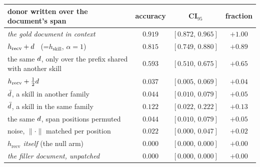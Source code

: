 \begin{tabular}{@{}lccc@{}}
\toprule
donor written over the document's span & accuracy & CI$_{95}$ & fraction \\
\midrule
\emph{the gold document in context} & $0.919$ & $[0.872,\,0.965]$ & $+1.00$ \\
$h_{\text{recv}}+d$ \ (=$h_{\text{skill}}$, $\alpha=1$) & $0.815$ & $[0.749,\,0.880]$ & $+0.89$ \\
the same $d$, only over the prefix shared with another skill & $0.593$ & $[0.510,\,0.675]$ & $+0.65$ \\
$h_{\text{recv}}+\tfrac12d$ & $0.037$ & $[0.005,\,0.069]$ & $+0.04$ \\
$\bar{d}$, a skill in another family & $0.044$ & $[0.010,\,0.079]$ & $+0.05$ \\
$\bar{d}$, a skill in the same family & $0.122$ & $[0.022,\,0.222]$ & $+0.13$ \\
the same $d$, span positions permuted & $0.044$ & $[0.010,\,0.079]$ & $+0.05$ \\
noise, $\|\cdot\|$ matched per position & $0.022$ & $[0.000,\,0.047]$ & $+0.02$ \\
\emph{$h_{\text{recv}}$ itself} (the null arm) & $0.000$ & $[0.000,\,0.000]$ & $+0.00$ \\
\emph{the filler document, unpatched} & $0.000$ & $[0.000,\,0.000]$ & $+0.00$ \\
\bottomrule
\end{tabular}
